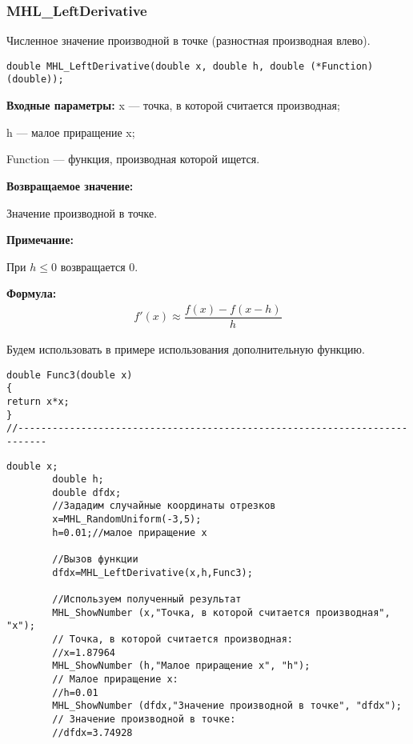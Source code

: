 \documentclass[a4paper,12pt]{article}
\begin{document}
\subsubsection{MHL\_LeftDerivative}\label{MHL_LeftDerivative}

Численное значение производной в точке (разностная производная влево).


\begin{lstlisting}[label=code_syntax_MHL_LeftDerivative,caption=Синтаксис]
double MHL_LeftDerivative(double x, double h, double (*Function)(double));
\end{lstlisting}

\textbf{Входные параметры:}
 x --- точка, в которой считается производная;
 
 h --- малое приращение x;
 
 Function --- функция, производная которой ищется.

\textbf{Возвращаемое значение:}
 
 Значение производной в точке.
 
 \textbf{Примечание:}
 
 При $h\leq0$ возвращается $0$.

\textbf{Формула:}
\begin{eqnarray*}
f'\left( x\right) \approx \dfrac{f\left( x\right)-f\left( x-h\right) }{h}
\end{eqnarray*}

Будем использовать в примере использования дополнительную функцию.

\begin{lstlisting}[caption=Дополнительная функция]
double Func3(double x)
{
return x*x;
}
//---------------------------------------------------------------------------
\end{lstlisting}


\begin{lstlisting}[label=code_use_MHL_LeftDerivative,caption=Пример использования]
        double x;
        double h;
        double dfdx;
        //Зададим случайные координаты отрезков
        x=MHL_RandomUniform(-3,5);
        h=0.01;//малое приращение x

        //Вызов функции
        dfdx=MHL_LeftDerivative(x,h,Func3);

        //Используем полученный результат
        MHL_ShowNumber (x,"Точка, в которой считается производная", "x");
        // Точка, в которой считается производная:
        //x=1.87964
        MHL_ShowNumber (h,"Малое приращение x", "h");
        // Малое приращение x:
        //h=0.01
        MHL_ShowNumber (dfdx,"Значение производной в точке", "dfdx");
        // Значение производной в точке:
        //dfdx=3.74928
\end{lstlisting}
\end{document}
